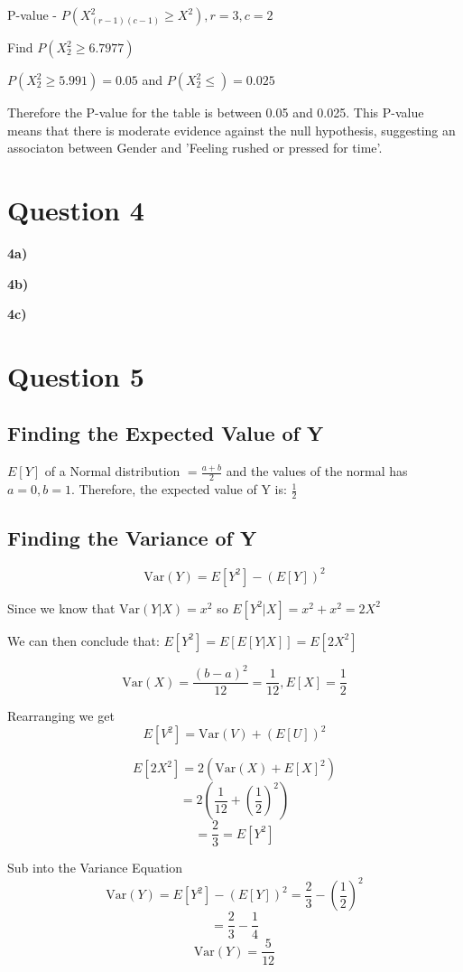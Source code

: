 \documentclass[oneside, a4paper]{article}
\begin{document}
P-value - $P(X^2_{(r-1)(c-1)} \geq X^2), r = 3, c = 2$

Find $P(X^2_{2} \geq 6.7977)$

$P(X^2_2 \geq 5.991) = 0.05$ and $P(X^2_2 \leq ) = 0.025$

Therefore the P-value for the table is between 0.05 and 0.025. This P-value means that there is moderate evidence against the null hypothesis, suggesting an associaton between Gender and 'Feeling rushed or pressed for time'.

\newpage
\section{Question 4}

\textbf{4a)}


\textbf{4b)}



\textbf{4c)}



\section{Question 5}

\subsection{Finding the Expected Value of Y}
$E[Y]$ of a Normal distribution $ = \frac{a+b}{2}$ and the values of the normal has $ a = 0, b = 1$. Therefore, the expected value of Y is: $\frac{1}{2}$

\subsection{Finding the Variance of Y}

\begin{center}
    $$\newcommand{\Var}{\mathrm{Var}} \Var(Y) = E[Y^2] - (E[Y])^2$$

    Since we know that $\newcommand{\Var}{\mathrm{Var}} \Var(Y|X) = x^2$ so $E[Y^2|X] = x^2 + x^2 = 2X^2$

    We can then conclude that: $E[Y^2] = E[E[Y|X]] = E[2X^2]$

    $$ \newcommand{\Var}{\mathrm{Var}} \Var(X) = \frac{(b-a)^2}{12} = \frac{1}{12} , E[X] = \frac{1}{2}$$

    Rearranging we get
    $$ \newcommand{\Var}{\mathrm{Var}} E[V^2] = \Var(V) + (E[U])^2$$

    $$\newcommand{\Var}{\mathrm{Var}} E[2X^2] = 2\left(\Var(X) + E[X]^2\right)$$
    $$ = 2\left(\frac{1}{12} + \left(\frac{1}{2}\right)^2\right)$$
    $$ = \frac{2}{3} = E[Y^2]$$

    Sub into the Variance Equation
    $$ \newcommand{\Var}{\mathrm{Var}} \Var(Y) = E[Y^2] - (E[Y])^2 = \frac{2}{3} - \left(\frac{1}{2}\right)^2$$
    $$ = \frac{2}{3} - \frac{1}{4} $$
    $$ \newcommand{\Var}{\mathrm{Var}} \Var(Y) = \frac{5}{12}$$
\end{center}
\end{document}
